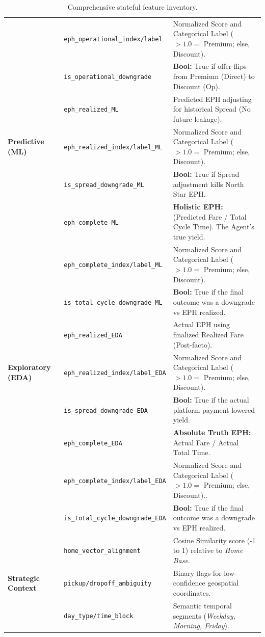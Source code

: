 \begin{table}[H]
\begin{tabularx}{\textwidth}{l l X}
        & \texttt{eph\_operational\_index/label} & Normalized Score and Categorical Label  ($>1.0=$ Premium; else, Discount). \\
        & \texttt{is\_operational\_downgrade} & \textbf{Bool:} True if offer flips from Premium (Direct) to Discount (Op). \\
        \midrule
        \multirow{3}{*}{\textbf{Predictive (ML)}} 
        & \texttt{eph\_realized\_ML} & Predicted EPH adjusting for historical Spread (No future leakage). \\
        & \texttt{eph\_realized\_index/label\_ML} & Normalized Score and Categorical Label  ($>1.0=$ Premium; else, Discount). \\
        & \texttt{is\_spread\_downgrade\_ML} & \textbf{Bool:} True if Spread adjustment kills North Star EPH. \\
        & \texttt{eph\_complete\_ML} & \textbf{Holistic EPH:} (Predicted Fare / Total Cycle Time). The Agent's true yield. \\
        & \texttt{eph\_complete\_index/label\_ML} & Normalized Score and Categorical Label  ($>1.0=$ Premium; else, Discount). \\
        & \texttt{is\_total\_cycle\_downgrade\_ML} & \textbf{Bool:} True if the final outcome was a downgrade vs EPH realized.\\
        \midrule
        \multirow{3}{*}{\textbf{Exploratory (EDA)}} 
        & \texttt{eph\_realized\_EDA} & Actual EPH using finalized Realized Fare (Post-facto). \\
        & \texttt{eph\_realized\_index/label\_EDA} & Normalized Score and Categorical Label  ($>1.0=$ Premium; else, Discount). \\
        & \texttt{is\_spread\_downgrade\_EDA} & \textbf{Bool:} True if the actual platform payment lowered yield. \\
        & \texttt{eph\_complete\_EDA} & \textbf{Absolute Truth EPH:} Actual Fare / Actual Total Time. \\
        & \texttt{eph\_complete\_index/label\_EDA} & Normalized Score and Categorical Label  ($>1.0=$ Premium; else, Discount).. \\
        & \texttt{is\_total\_cycle\_downgrade\_EDA} & \textbf{Bool:} True if the final outcome was a downgrade vs EPH realized. \\
        \midrule
        \multirow{3}{*}{\textbf{Strategic Context}} 
        & \texttt{home\_vector\_alignment} & Cosine Similarity score (-1 to 1) relative to \textit{Home Base}. \\
        & \texttt{pickup/dropoff\_ambiguity} & Binary flags for low-confidence geospatial coordinates. \\
        & \texttt{day\_type/time\_block} & Semantic temporal segments (\textit{Weekday, Morning, Friday}). \\
        \bottomrule
    \end{tabularx}
    \caption{Comprehensive stateful feature inventory.}
    \label{tab:silver_palette}
\end{table}


